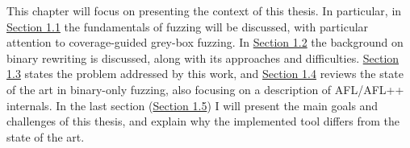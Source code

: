 This chapter will focus on presenting the context of this thesis.
In particular, in \hyperref[sec:fuzz_background]{Section 1.1} the fundamentals of fuzzing will be discussed, with particular attention to coverage-guided grey-box fuzzing.
In \hyperref[sec:biniary_rewriting]{Section 1.2} the background on binary rewriting is discussed, along with its approaches and difficulties.
\hyperref[sec:problem_statement]{Section 1.3} states the problem addressed by this work,
and \hyperref[sec:state_of_the_art]{Section 1.4} reviews the state of the art in binary-only fuzzing, also focusing on a description
of AFL/AFL++ internals. In the last section (\hyperref[sec:goals-and-challenges]{Section 1.5}) I will present the main
goals and challenges of this thesis, and explain why the implemented tool differs from the state of the art.

